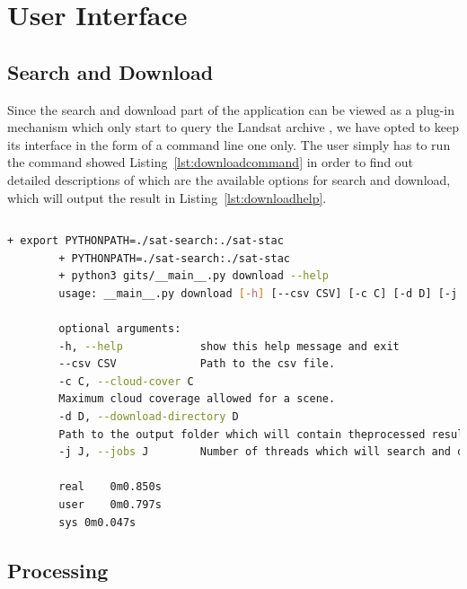 \documentclass[12pt, a4paper]{report}
\begin{document}
	\newpage{}
	\section{User Interface}
	\label{seq:gui}
	
	\subsection{Search and Download}
	\label{subsec:search_download}
	
	\par Since the search and download part of the application can be viewed as a plug-in mechanism which only start to query the Landsat archive , we have opted to keep its interface in the form of a command line one only. The user simply has to run the command showed Listing~\ref{lst:downloadcommand} in order to find out detailed descriptions of which are the available options for search and download, which will output the result in Listing~\ref{lst:downloadhelp}.
	
	\begin{lstlisting}[caption={Command for sarch and download details},label={lst:downloadcommand},language=Bash]
		% bash -x run_download.sh --help
	\end{lstlisting}
	
	\begin{lstlisting}[caption={Detailed parameters required for the download script.},label={lst:downloadhelp},language=Bash]
		+ export PYTHONPATH=./sat-search:./sat-stac
		+ PYTHONPATH=./sat-search:./sat-stac
		+ python3 gits/__main__.py download --help
		usage: __main__.py download [-h] [--csv CSV] [-c C] [-d D] [-j J]
		
		optional arguments:
		-h, --help            show this help message and exit
		--csv CSV             Path to the csv file.
		-c C, --cloud-cover C
		Maximum cloud coverage allowed for a scene.
		-d D, --download-directory D
		Path to the output folder which will contain theprocessed results.
		-j J, --jobs J        Number of threads which will search and download.
		
		real	0m0.850s
		user	0m0.797s
		sys	0m0.047s
	\end{lstlisting}
	
	\subsection{Processing}
	\label{ssubsec:processing_gui}
\end{document}

